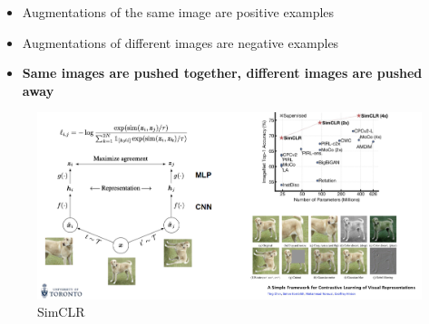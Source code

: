 \begin{itemize}
    \item Augmentations of the same image are positive examples
    \item Augmentations of different images are negative examples
    \item \textbf{Same images are pushed together, different images are pushed away}
\end{itemize}

\begin{figure}[h!t]
    \centering
    \includegraphics[width=0.9\linewidth]{simclr.png}
    \caption{SimCLR}
    \label{fig:enter-label}
\end{figure}
